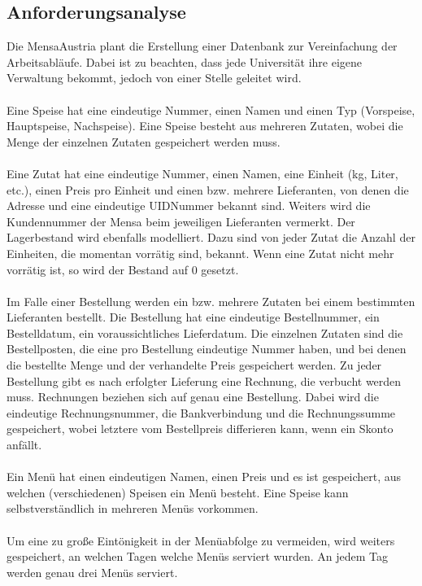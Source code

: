 \documentclass[12pt,a4paper]{article}
\begin{document}
		\subsection{Anforderungsanalyse}
			Die MensaAustria plant die Erstellung einer Datenbank zur Vereinfachung der Arbeitsabläufe. Dabei
			ist zu beachten, dass jede Universität ihre eigene Verwaltung bekommt, jedoch von einer Stelle
			geleitet wird.\\\\
			Eine Speise hat eine eindeutige Nummer, einen Namen und einen Typ (Vorspeise, Hauptspeise,
			Nachspeise). Eine Speise besteht aus mehreren Zutaten, wobei die Menge der einzelnen Zutaten
			gespeichert werden muss.\\\\
			Eine Zutat hat eine eindeutige Nummer, einen Namen, eine Einheit (kg, Liter, etc.), einen Preis pro
			Einheit und einen bzw. mehrere Lieferanten, von denen die Adresse und eine eindeutige
			UIDNummer bekannt sind. Weiters wird die Kundennummer der Mensa beim jeweiligen Lieferanten
			vermerkt. Der Lagerbestand wird ebenfalls modelliert. Dazu sind von jeder Zutat die Anzahl der
			Einheiten, die momentan vorrätig sind, bekannt. Wenn eine Zutat nicht mehr vorrätig ist, so wird der
			Bestand auf 0 gesetzt.\\\\
			Im Falle einer Bestellung werden ein bzw. mehrere Zutaten bei einem bestimmten Lieferanten
			bestellt. Die Bestellung hat eine eindeutige Bestellnummer, ein Bestelldatum, ein voraussichtliches
			Lieferdatum. Die einzelnen Zutaten sind die Bestellposten, die eine pro Bestellung eindeutige
			Nummer haben, und bei denen die bestellte Menge und der verhandelte Preis gespeichert werden.
			Zu jeder Bestellung gibt es nach erfolgter Lieferung eine Rechnung, die verbucht werden muss.
			Rechnungen beziehen sich auf genau eine Bestellung. Dabei wird die eindeutige Rechnungsnummer,
			die Bankverbindung und die Rechnungssumme gespeichert, wobei letztere vom Bestellpreis
			differieren kann, wenn ein Skonto anfällt.\\\\
			Ein Menü hat einen eindeutigen Namen, einen Preis und es ist gespeichert, aus welchen
			(verschiedenen) Speisen ein Menü besteht. Eine Speise kann selbstverständlich in mehreren Menüs
			vorkommen.\\\\
			Um eine zu große Eintönigkeit in der Menüabfolge zu vermeiden, wird weiters gespeichert, an
			welchen Tagen welche Menüs serviert wurden. An jedem Tag werden genau drei Menüs serviert.
\end{document}
